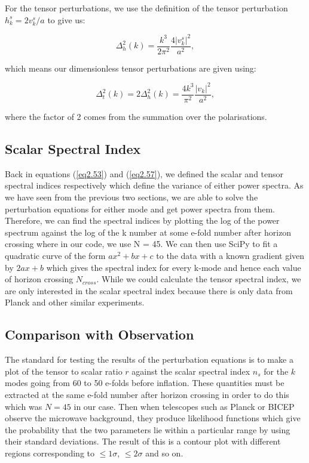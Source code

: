 \documentclass[a4paper,12pt,twoside]{report}
\newcommand{\abs}[1]{\lvert#1\rvert}
\begin{document}
For the tensor perturbations, we use the definition of the tensor perturbation $h_{k}^{s} = 2v_{k}^{s} / a$ to give us:

\begin{equation} \label{eq3.35}
\Delta^{2}_{h}(k) = \frac{k^{3}}{2\pi^{2}} \frac{4\abs{v_{k}^{s}}^{2}}{a^{2}},
\end{equation}

which means our dimensionless tensor perturbations are given using:

\begin{equation} \label{eq3.36}
\Delta^{2}_{t}(k) = 2\Delta^{2}_{h}(k) = \frac{4k^{3}}{\pi^{2}} \frac{\abs{v_{k}}^{2}}{a^{2}},
\end{equation}

where the factor of 2 comes from the summation over the polarisations.

\subsection{Scalar Spectral Index} \label{subsec:ScalSpecIndex}

Back in equations (\ref{eq2.53}) and (\ref{eq2.57}), we defined the scalar and tensor spectral indices respectively which define the variance of either power spectra. As we have seen from the previous two sections, we are able to solve the perturbation equations for either mode and get power spectra from them. Therefore, we can find the spectral indices by plotting the log of the power spectrum against the log of the k number at some e-fold number after horizon crossing where in our code, we use N = 45. We can then use SciPy to fit a quadratic curve of the form $ax^{2} + bx + c$ to the data with a known gradient given by $2ax + b$ which gives the spectral index for every k-mode and hence each value of horizon crossing $N_{cross}$. While we could calculate the tensor spectral index, we are only interested in the scalar spectral index because there is only data from Planck and other similar experiments.

\subsection{Comparison with Observation} \label{subsec:CompWithObs}

The standard for testing the results of the perturbation equations is to make a plot of the tensor to scalar ratio $r$ against the scalar spectral index $n_{s}$ for the $k$ modes going from 60 to 50 e-folds before inflation. These quantities must be extracted at the same e-fold number after horizon crossing in order to do this which was $N = 45$ in our case. Then when telescopes such as Planck or BICEP observe the microwave background, they produce likelihood functions which give the probability that the two parameters lie within a particular range by using their standard deviations. The result of this is a contour plot with different regions corresponding to $\le 1\sigma$, $\le 2\sigma$ and so on.
\end{document}
